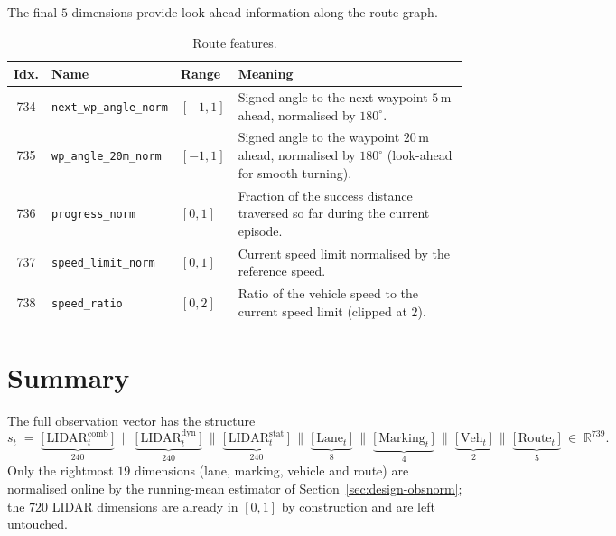 The final \(5\) dimensions provide look-ahead information along the route graph.

\begin{table}[H]
  \centering
  \caption{Route features.}
  \label{tab:obs-route}
  \small
  \begin{tabular}{@{}cllp{6cm}@{}}
    \toprule
    \textbf{Idx.} & \textbf{Name} & \textbf{Range} & \textbf{Meaning} \\
    \midrule
    734 & \texttt{next\_wp\_angle\_norm} & \([-1, 1]\) & Signed angle to the next waypoint
        \(5\,\mathrm{m}\) ahead, normalised by \(180^\circ\). \\
    735 & \texttt{wp\_angle\_20m\_norm} & \([-1, 1]\) & Signed angle to the waypoint
        \(20\,\mathrm{m}\) ahead, normalised by \(180^\circ\) (look-ahead for smooth turning). \\
    736 & \texttt{progress\_norm}       & \([0, 1]\) & Fraction of the success distance
        traversed so far during the current episode. \\
    737 & \texttt{speed\_limit\_norm}   & \([0, 1]\) & Current speed limit normalised by the
        reference speed. \\
    738 & \texttt{speed\_ratio}         & \([0, 2]\) & Ratio of the vehicle speed to the
        current speed limit (clipped at \(2\)). \\
    \bottomrule
  \end{tabular}
\end{table}

\section{Summary}\label{app:obs-summary}

The full observation vector has the structure
\begin{equation*}
  s_t \;=\; \underbrace{\big[\, \text{LIDAR}^{\text{comb}}_t \,\big]}_{240}
         \;\|\; \underbrace{\big[\, \text{LIDAR}^{\text{dyn}}_t \,\big]}_{240}
         \;\|\; \underbrace{\big[\, \text{LIDAR}^{\text{stat}}_t \,\big]}_{240}
         \;\|\; \underbrace{\big[\, \text{Lane}_t \,\big]}_{8}
         \;\|\; \underbrace{\big[\, \text{Marking}_t \,\big]}_{4}
         \;\|\; \underbrace{\big[\, \text{Veh}_t \,\big]}_{2}
         \;\|\; \underbrace{\big[\, \text{Route}_t \,\big]}_{5}
         \;\in\; \mathbb{R}^{739}.
\end{equation*}
Only the rightmost \(19\) dimensions (lane, marking, vehicle and route) are normalised online
by the running-mean estimator of Section~\ref{sec:design-obsnorm}; the \(720\) LIDAR dimensions
are already in \([0,1]\) by construction and are left untouched.
